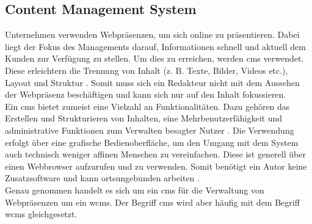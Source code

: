\subsection{Content Management System}
Unternehmen verwenden Webpräsenzen, um sich online zu präsentieren. Dabei liegt der Fokus des Managements darauf, Informationen schnell und aktuell dem Kunden zur Verfügung zu stellen. Um dies zu erreichen, werden \acf{cms} verwendet. Diese erleichtern die Trennung von Inhalt (z. B. Texte, Bilder, Videos etc.), Layout und Struktur \cite[S.1 ff.]{spo09}. Somit muss sich ein Redakteur nicht mit dem Aussehen der Webpräsenz beschäftigen und kann sich nur auf den Inhalt fokussieren. \\
Ein \ac{cms} bietet zumeist eine Vielzahl an Funktionalitäten. Dazu gehören das Erstellen und Strukturieren von Inhalten, eine Mehrbenutzerfähigkeit und administrative Funktionen zum Verwalten besagter Nutzer \cite[S. 55]{spo09}.  Die Verwendung erfolgt über eine grafische Bedienoberfläche, um den Umgang mit dem System auch technisch weniger affinen Menschen zu vereinfachen. Diese ist generell über einen Webbrowser aufzurufen und zu verwenden. Somit benötigt ein Autor keine Zusatzsoftware und kann ortsungebunden arbeiten \cite[S. 19 f.]{bon11}. \\
Genau genommen handelt es sich um ein \ac{cms} für die Verwaltung von Webpräsenzen um ein \ac{wcms}. Der Begriff \ac{cms} wird aber häufig mit dem Begriff \ac{wcms} gleichgesetzt.

